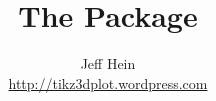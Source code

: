 \documentclass[10pt,letterpaper,oneside]{memoir}
\title{The \texttt{\tdplot} Package}
\author{Jeff Hein\\ \url{http://tikz3dplot.wordpress.com}}
\newif\ifscratch		%
\begin{document}




\ifscratch
	
\end{document}
